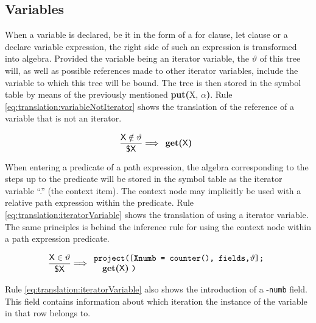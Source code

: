 \subsection{Variables}
\label{sect:translation:variables}
When a variable is declared, be it in the form of a \textsf{for} clause,
\textsf{let} clause or a \textsf{declare variable} expression, the right side
of such an expression is transformed into algebra. Provided the
variable being an iterator variable, the $\vartheta$ of this tree will, as well
as possible references made to other iterator variables, include the variable
to which this tree will be bound. The tree is then stored in the symbol
table by means of the previously mentioned \textbf{put(}\textsf{X},
$\alpha$\textbf{)}. Rule \ref{eq:translation:variableNotIterator} shows the
translation of the reference of a variable that is not an iterator.

\begin{equation}
\centering
\frac{\displaystyle \textsf{X} \notin \vartheta}{\displaystyle \textsf{\$X}}
\Longrightarrow
\begin{array}{l}
	\mbox{\textbf{get(}\textsf{X}\textbf{)}}
\end{array}
\label{eq:translation:variableNotIterator}
\end{equation}

When entering a predicate of a path expression, the algebra corresponding to
the steps up to the predicate will be stored in the symbol table as the
iterator variable \textsf{``.''} (the context item). The context node may
implicitly be used with a relative path expression within the predicate. Rule
\ref{eq:translation:iteratorVariable} shows the translation of using a
iterator variable. The same principles is behind the inference rule for using
the context node within a path expression predicate.

\begin{equation}
\centering
\frac{\displaystyle \textsf{X} \in \vartheta}{\displaystyle \textsf{\$X}}
\Longrightarrow
\begin{array}{l}
	\mbox{\texttt{project([Xnumb = counter(), fields,}} \vartheta
	\mbox{\texttt{];}}
	\\ \quad
	\mbox{\textbf{get(}\textsf{X}\textbf{)} \texttt{)}}
\end{array}
\label{eq:translation:iteratorVariable}
\end{equation}


Rule \ref{eq:translation:iteratorVariable} also shows the introduction of a
-\verb!numb! field. This field contains information about which iteration the
instance of the variable in that row belongs to.

